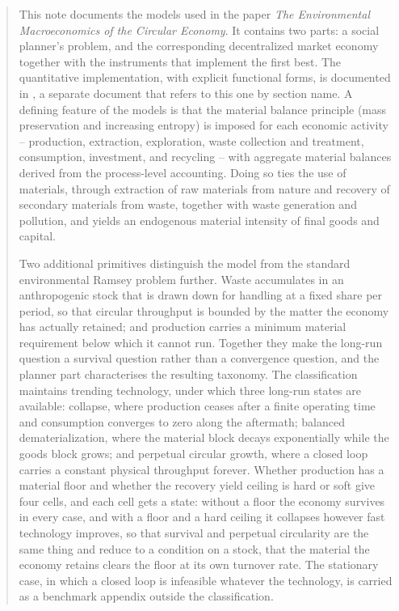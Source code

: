 \begin{abstract}
\noindent
This note documents the models used in the paper \emph{The Environmental Macroeconomics of the Circular Economy}. It contains two parts: a social planner's problem, and the corresponding decentralized market economy together with the instruments that implement the first best. The quantitative implementation, with explicit functional forms, is documented in \quantnote{}, a separate document that refers to this one by section name. A defining feature of the models is that the material balance principle (mass preservation and increasing entropy) is imposed for each economic activity -- production, extraction, exploration, waste collection and treatment, consumption, investment, and recycling -- with aggregate material balances derived from the process-level accounting. Doing so ties the use of materials, through extraction of raw materials from nature and recovery of secondary materials from waste, together with waste generation and pollution, and yields an endogenous material intensity of final goods and capital.


Two additional primitives distinguish the model from the standard environmental Ramsey problem further. Waste accumulates in an anthropogenic stock that is drawn down for handling at a fixed share per period, so that circular throughput is bounded by the matter the economy has actually retained; and production carries a minimum material requirement below which it cannot run. Together they make the long-run question a survival question rather than a convergence question, and the planner part characterises the resulting taxonomy. The classification maintains trending technology, under which three long-run states are available: collapse, where production ceases after a finite operating time and consumption converges to zero along the aftermath; balanced dematerialization, where the material block decays exponentially while the goods block grows; and perpetual circular growth, where a closed loop carries a constant physical throughput forever. Whether production has a material floor and whether the recovery yield ceiling is hard or soft give four cells, and each cell gets a state: without a floor the economy survives in every case, and with a floor and a hard ceiling it collapses however fast technology improves, so that survival and perpetual circularity are the same thing and reduce to a condition on a stock, that the material the economy retains clears the floor at its own turnover rate. The stationary case, in which a closed loop is infeasible whatever the technology, is carried as a benchmark appendix outside the classification.



\end{abstract}
